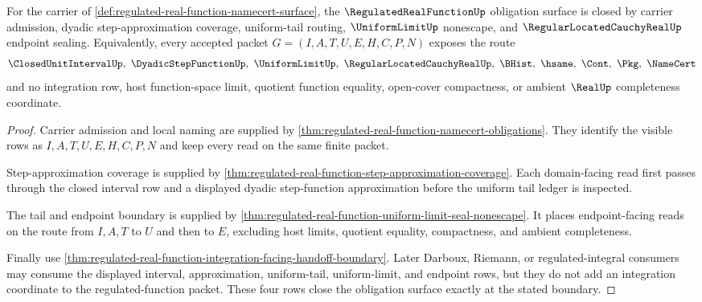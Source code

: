 \begin{theorem}
\label{thm:regulated-real-function-obligation-closure}
For the carrier of \autoref{def:regulated-real-function-namecert-surface}, the $\RegulatedRealFunctionUp$ obligation surface is closed by carrier admission, dyadic step-approximation coverage, uniform-tail routing, $\UniformLimitUp$ nonescape, and $\RegularLocatedCauchyRealUp$ endpoint sealing. Equivalently, every accepted packet $G=(I,A,T,U,E,H,C,P,N)$ exposes the route
$$
\ClosedUnitIntervalUp,\ \DyadicStepFunctionUp,\ \UniformLimitUp,\ \RegularLocatedCauchyRealUp,\ \BHist,\ \hsame,\ \Cont,\ \Pkg,\ \NameCert
$$
and no integration row, host function-space limit, quotient function equality, open-cover compactness, or ambient $\RealUp$ completeness coordinate.
\end{theorem}
\begin{proof}
Carrier admission and local naming are supplied by \autoref{thm:regulated-real-function-namecert-obligations}. They identify the visible rows as $I,A,T,U,E,H,C,P,N$ and keep every read on the same finite packet.

Step-approximation coverage is supplied by \autoref{thm:regulated-real-function-step-approximation-coverage}. Each domain-facing read first passes through the closed interval row and a displayed dyadic step-function approximation before the uniform tail ledger is inspected.

The tail and endpoint boundary is supplied by \autoref{thm:regulated-real-function-uniform-limit-seal-nonescape}. It places endpoint-facing reads on the route from $I,A,T$ to $U$ and then to $E$, excluding host limits, quotient equality, compactness, and ambient completeness.

Finally use \autoref{thm:regulated-real-function-integration-facing-handoff-boundary}. Later Darboux, Riemann, or regulated-integral consumers may consume the displayed interval, approximation, uniform-tail, uniform-limit, and endpoint rows, but they do not add an integration coordinate to the regulated-function packet. These four rows close the obligation surface exactly at the stated boundary.
\end{proof}


